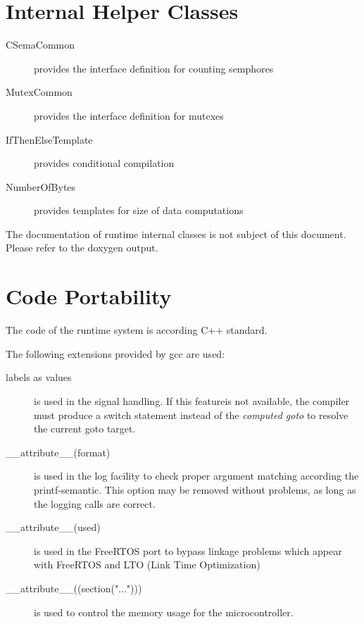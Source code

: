 \section{Internal Helper Classes}
\begin{description}
\item[CSemaCommon]  provides the interface definition for counting semphores
\item[MutexCommon] provides the interface definition for mutexes
\item[IfThenElseTemplate] provides conditional compilation
\item[NumberOfBytes] provides templates for size of data computations
\end{description}
The documentation of runtime internal classes is not subject of this document.
Please refer to the doxygen output.

\section{Code Portability}
The code of the runtime system is according C++ standard.

The following extensions provided by gcc are used:
\begin{description}
\item[labels as values] is used in the signal handling. 
   If this featureis not available, the compiler must produce a switch 
   statement instead of the {\em computed goto} to resolve
   the current goto target.
\item[\_\_attribute\_\_(format)] is used in the log facility to check
   proper argument matching according the printf-semantic.
   This option may be removed without problems, as long as the logging
   calls are correct.
\item[\_\_attribute\_\_(used)] is used in the FreeRTOS port to bypass linkage
   problems which appear with FreeRTOS and LTO (Link Time Optimization)
\item[\_\_attribute\_\_((section("...")))] is used to control the
   memory usage for the microcontroller.
\end{description}
   
